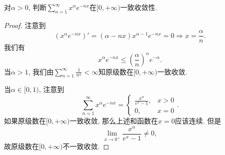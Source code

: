 \documentclass[../../main.tex]{subfiles}%
\begin{document}
\begin{example}
对$\alpha>0$, 判断$\sum\limits_{n=1}^{\infty}x^\alpha e^{-nx}$在$[0,+\infty)$一致收敛性.
\end{example}
\begin{proof}
注意到
$$
\left( x^{\alpha}e^{-nx} \right) '=(\alpha -nx)x^{\alpha -1}e^{-nx}=0\Rightarrow x=\frac{\alpha}{n}.
$$
我们有
$$
x^\alpha e^{-nx}\leqslant\left(\frac{\alpha}{n}\right)^\alpha e^{-\alpha}.
$$
当$\alpha>1$, 我们由$\sum\limits_{n=1}^{\infty}\frac{1}{n^\alpha}<\infty$知原级数在$[0,+\infty)$一致收敛.

当$\alpha\in[0,1)$, 注意到
$$
\sum_{n=1}^{\infty}x^\alpha e^{-nx}=
\begin{cases}
\frac{x^\alpha}{e^x-1},&x>0\\
0,&x=0
\end{cases}.
$$
如果原级数在$[0,+\infty)$一致收敛, 那么上述和函数在$x=0$应该连续. 但是
$$
\lim_{x\to0^+}\frac{x^\alpha}{e^x-1}\neq0,
$$
故原级数在$[0,+\infty)$不一致收敛.
\end{proof}
\end{document}

